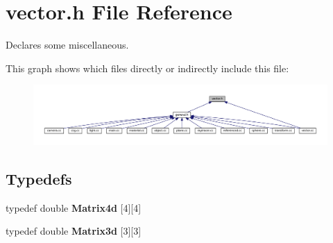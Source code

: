 \section{vector.\+h File Reference}
\label{vector_8h}


Declares some miscellaneous.  


This graph shows which files directly or indirectly include this file\+:
\nopagebreak
\begin{figure}[H]
\begin{center}
\leavevmode
\includegraphics[width=350pt]{vector_8h__dep__incl}
\end{center}
\end{figure}
\subsection*{Typedefs}
\begin{DoxyCompactItemize}
\item 
typedef double {\bf Matrix4d} [4][4]
\item 
typedef double {\bf Matrix3d} [3][3]
\end{DoxyCompactItemize}
